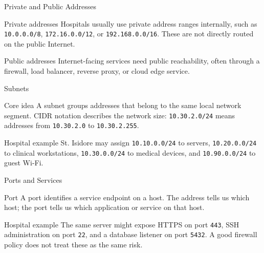 \documentclass[presentation]{beamer}
\begin{document}
\begin{frame}[c]{Private and Public Addresses}
\begin{block}{Private addresses}
Hospitals usually use private address ranges internally, such as \texttt{10.0.0.0/8},
\texttt{172.16.0.0/12}, or \texttt{192.168.0.0/16}. These are not directly routed on the public
Internet.
\end{block}

\begin{block}{Public addresses}
Internet-facing services need public reachability, often through a firewall, load balancer, reverse
proxy, or cloud edge service.
\end{block}
\end{frame}

\begin{frame}[c]{Subnets}
\begin{block}{Core idea}
A subnet groups addresses that belong to the same local network segment. CIDR notation describes
the network size: \texttt{10.30.2.0/24} means addresses from \texttt{10.30.2.0} to
\texttt{10.30.2.255}.
\end{block}

\begin{exampleblock}{Hospital example}
St. Isidore may assign \texttt{10.10.0.0/24} to servers, \texttt{10.20.0.0/24} to clinical
workstations, \texttt{10.30.0.0/24} to medical devices, and \texttt{10.90.0.0/24} to guest Wi-Fi.
\end{exampleblock}
\end{frame}

\begin{frame}[c]{Ports and Services}
\begin{block}{Port}
A port identifies a service endpoint on a host. The address tells us which host; the port tells us
which application or service on that host.
\end{block}

\begin{exampleblock}{Hospital example}
The same server might expose HTTPS on port \texttt{443}, SSH administration on port \texttt{22},
and a database listener on port \texttt{5432}. A good firewall policy does not treat these as the
same risk.
\end{exampleblock}
\end{frame}
\end{document}
